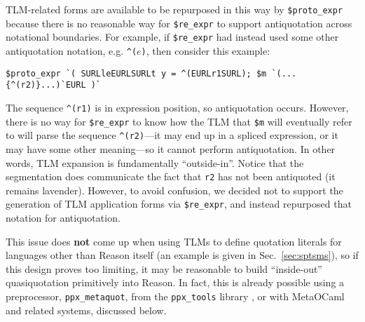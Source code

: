 \documentclass[acmsmall]{acmart}
\newcommand{\li}[1]{\lstinline[basicstyle=\ttfamily\fontsize{9pt}{1em}\selectfont]{#1}}
\begin{document}
TLM-related forms are available to be repurposed in this way by \li{$proto_expr} because there is no reasonable way for \li{$re_expr} to support antiquotation across notational boundaries. For example, if \li{$re_expr} had instead used some other antiquotation notation, e.g. \li{^(}$e$\li{)}, then consider this example:
\begin{lstlisting}[numbers=none]
  $proto_expr `( SURLleEURLSURLt y = ^(EURLr1SURL); $m `(...{^(r2)}...)`EURL )`
\end{lstlisting}
The sequence \li{^(r1)} is in expression position, so antiquotation occurs. However, there is no way for \li{$re_expr} to know how the TLM that \li{$m} will eventually refer to will parse the sequence \li{^(r2)}---it may end up in a spliced expression, or it may have some other meaning---so it cannot perform antiquotation. In other words, TLM expansion is fundamentally ``outside-in''.  Notice that the segmentation does communicate the fact that \li{r2} has not been antiquoted (it remains lavender). However, to avoid confusion, we decided not to support the generation of TLM application forms via \li{$re_expr}, and instead repurposed that notation for antiquotation. 

This issue does \textbf{not} come up when using TLMs to define quotation literals for languages other than Reason itself (an example is given in Sec.~\ref{sec:sptsms}), so if this design proves too limiting, it may be reasonable to build ``inside-out'' quasiquotation primitively into Reason. In fact, this is already possible using a preprocessor, \li{ppx_metaquot}, from the \li{ppx_tools} library \cite{ppx-tools}, or with MetaOCaml and related systems, discussed below. %
\end{document}
